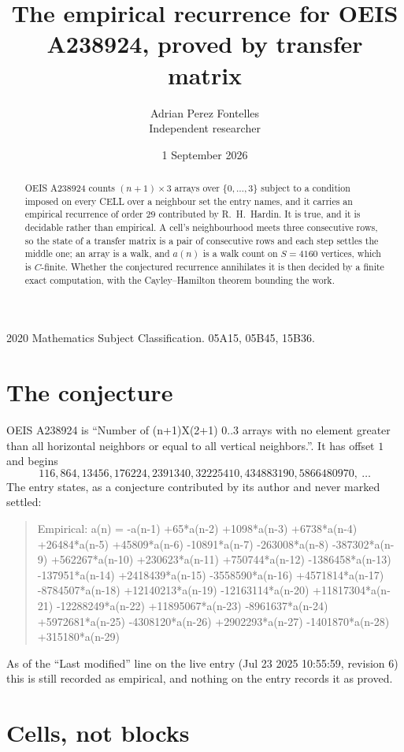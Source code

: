 \documentclass[11pt,a4paper]{article}
\title{The empirical recurrence for OEIS A238924, proved by transfer matrix}
\author{Adrian Perez Fontelles\\ \small Independent researcher}
\date{1 September 2026}
\theoremstyle{plain}
\theoremstyle{definition}
\begin{document}
\maketitle

\begin{abstract}
OEIS A238924 counts $(n+1)\times3$ arrays over $\{0,\dots,3\}$ subject to a condition imposed on
every CELL over a neighbour set the entry names, and it carries an empirical recurrence of
order $29$ contributed by R.~H.~Hardin. It is true, and it is decidable rather than
empirical. A cell's neighbourhood meets three consecutive rows, so the state of a transfer
matrix is a pair of consecutive rows and each step settles the middle one; an array is a
walk, and $a(n)$ is a walk count on $S=4160$ vertices, which is $C$-finite. Whether the
conjectured recurrence annihilates it is then decided by a finite exact computation, with the
Cayley--Hamilton theorem bounding the work.
\end{abstract}

\noindent\small 2020 Mathematics Subject Classification. 05A15, 05B45, 15B36.\normalsize

\section{The conjecture}

OEIS A238924 is ``Number of (n+1)X(2+1) 0..3 arrays with no element greater than all horizontal neighbors or equal to all vertical neighbors.''. It has offset $1$ and begins
\[
116, 864, 13456, 176224, 2391340, 32225410, 434883190, 5866480970,\ \dots
\]
The entry states, as a conjecture contributed by its author and never marked settled:
\begin{quote}
Empirical: a(n) = -a(n-1) +65*a(n-2) +1098*a(n-3) +6738*a(n-4) +26484*a(n-5) +45809*a(n-6) -10891*a(n-7) -263008*a(n-8) -387302*a(n-9) +562267*a(n-10) +230623*a(n-11) +750744*a(n-12) -1386458*a(n-13) -137951*a(n-14) +2418439*a(n-15) -3558590*a(n-16) +4571814*a(n-17) -8784507*a(n-18) +12140213*a(n-19) -12163114*a(n-20) +11817304*a(n-21) -12288249*a(n-22) +11895067*a(n-23) -8961637*a(n-24) +5972681*a(n-25) -4308120*a(n-26) +2902293*a(n-27) -1401870*a(n-28) +315180*a(n-29)
\end{quote}
As of the ``Last modified'' line on the live entry (Jul 23 2025 10:55:59, revision 6) this is still
recorded as empirical, and nothing on the entry records it as proved.

\section{Cells, not blocks}
\end{document}
